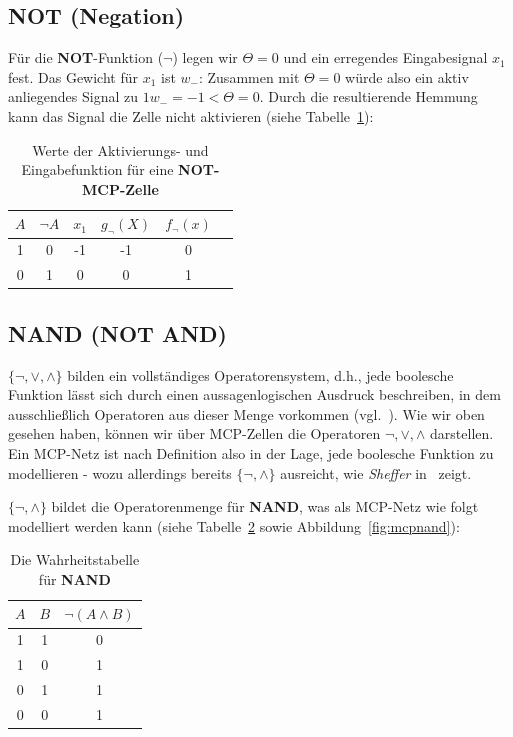 {\subsection*{NOT (Negation)}

Für die \textbf{NOT}-Funktion ($\neg$) legen wir $\Theta = 0$ und ein erregendes Eingabesignal $x_1$ fest.
Das Gewicht für $x_1$ ist $w_-$: Zusammen mit $\Theta = 0$ würde also ein aktiv anliegendes Signal zu $1  w_-=-1 < \Theta = 0$.
Durch die resultierende Hemmung kann das Signal die Zelle nicht aktivieren (siehe Tabelle~\ref{tab:mcp-neg}):


\begin{table} %
    \centering
    \begin{tabular}{c | c | c |c | c | c}
        $A$ & $\neg A$ & $x_1$ & $g_{\neg}(X)$ & $f_{\neg}(x)$  \\
        \hline
         1   & 0        & -1     &  -1             & 0             \\
         0   & 1        & 0     &  0             &  1             \\
    \end{tabular}
    \caption{Werte der Aktivierungs- und Eingabefunktion für eine \textbf{NOT-MCP-Zelle}}
    \label{tab:mcp-neg}
\end{table}


\subsection*{NAND (NOT AND)}

$\{\neg, \lor, \land\}$ bilden ein vollständiges Operatorensystem, d.h., jede boolesche Funktion lässt sich durch einen aussagenlogischen Ausdruck  beschreiben, in dem ausschließlich Operatoren aus dieser Menge vorkommen (vgl.~\cite[89]{Hof22}).
Wie wir oben gesehen haben, können wir über MCP-Zellen die Operatoren $\neg, \lor, \land$ darstellen.
Ein MCP-Netz ist nach Definition also in der Lage, jede boolesche Funktion zu modellieren - wozu allerdings bereits $\{\neg, \land\}$ ausreicht, wie \textit{Sheffer} in~\cite{She13} zeigt.

$\{\neg, \land\}$ bildet die Operatorenmenge für \textbf{NAND}, was als MCP-Netz wie folgt modelliert werden kann (siehe Tabelle~\ref{tab:nand} sowie Abbildung~\ref{fig:mcpnand}):

\begin{table} %
    \centering
    \begin{tabular}{c | c | c}
        $A$ & $B$ & $\neg(A \land B)$ \\
        \hline
        1   & 1   & 0           \\
        1   & 0   & 1           \\
        0   & 1   & 1           \\
        0   & 0   & 1           \\
    \end{tabular}
    \caption{Die Wahrheitstabelle für \textbf{NAND}}
    \label{tab:nand}
\end{table}


}
